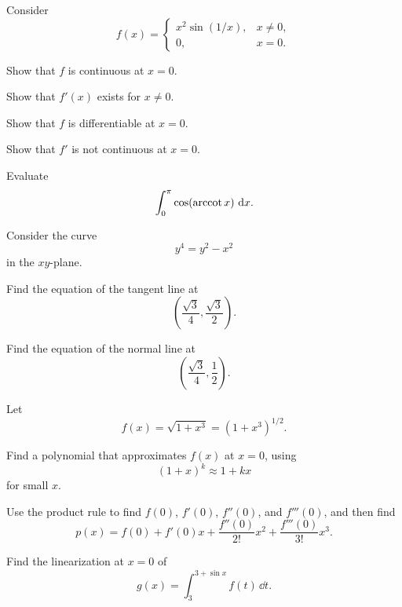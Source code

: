 \begin{problem}
Consider
\[
f(x)=
\begin{cases}
x^2\sin(1/x), & x\ne0,\\
0, & x=0.
\end{cases}
\]
\begin{problemsubparts}
\item Show that $f$ is continuous at $x=0$.
\item Show that $f'(x)$ exists for $x\ne0$.
\item Show that $f$ is differentiable at $x=0$.
\item Show that $f'$ is not continuous at $x=0$.
\end{problemsubparts}
\end{problem}

\begin{problem}
Evaluate
\[
\int_0^\pi \cos(\operatorname{arccot} x)\,\mathop{}\!\mathrm{d} x.
\]
\end{problem}

\begin{problem}
Consider the curve
\[
y^4=y^2-x^2
\]
in the $xy$-plane.
\begin{problemsubparts}
\item Find the equation of the tangent line at
\[
\left(\frac{\sqrt3}{4},\frac{\sqrt3}{2}\right).
\]
\item Find the equation of the normal line at
\[
\left(\frac{\sqrt3}{4},\frac12\right).
\]
\end{problemsubparts}
\end{problem}

\begin{problem}
Let
\[
f(x)=\sqrt{1+x^3}=(1+x^3)^{1/2}.
\]
\begin{problemsubparts}
\item Find a polynomial that approximates $f(x)$ at $x=0$, using
\[
(1+x)^k\approx1+kx
\]
for small $x$.
\item Use the product rule to find $f(0)$, $f'(0)$, $f''(0)$, and $f'''(0)$, and then find
\[
p(x)=f(0)+f'(0)x+\frac{f''(0)}{2!}x^2+\frac{f'''(0)}{3!}x^3.
\]
\item Find the linearization at $x=0$ of
\[
g(x)=\int_3^{3+\sin x}f(t)\,\dd t.
\]
\end{problemsubparts}
\end{problem}

